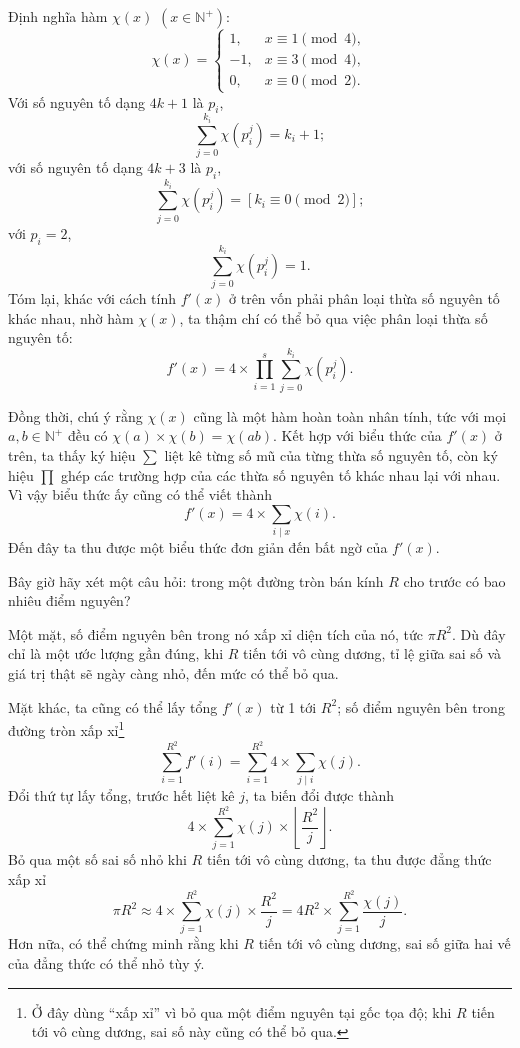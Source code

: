 \documentclass[11pt]{article}
\begin{document}
Định nghĩa hàm \(\chi(x)\) \((x\in\mathbb N^+)\):
\[
\chi(x)=
\begin{cases}
1, & x\equiv1\pmod4,\\
-1, & x\equiv3\pmod4,\\
0, & x\equiv0\pmod2.
\end{cases}
\]
Với số nguyên tố dạng \(4k+1\) là \(p_i\),
\[
  \sum_{j=0}^{k_i}\chi(p_i^j)=k_i+1;
\]
với số nguyên tố dạng \(4k+3\) là \(p_i\),
\[
  \sum_{j=0}^{k_i}\chi(p_i^j)=[k_i\equiv0\pmod2];
\]
với \(p_i=2\),
\[
  \sum_{j=0}^{k_i}\chi(p_i^j)=1.
\]
Tóm lại, khác với cách tính \(f'(x)\) ở trên vốn phải phân loại thừa số nguyên
tố khác nhau, nhờ hàm \(\chi(x)\), ta thậm chí có thể bỏ qua việc phân loại
thừa số nguyên tố:
\[
  f'(x)=4\times\prod_{i=1}^{s}\sum_{j=0}^{k_i}\chi(p_i^j).
\]

Đồng thời, chú ý rằng \(\chi(x)\) cũng là một hàm hoàn toàn nhân tính, tức với
mọi \(a,b\in\mathbb N^+\) đều có \(\chi(a)\times\chi(b)=\chi(ab)\). Kết hợp
với biểu thức của \(f'(x)\) ở trên, ta thấy ký hiệu \(\sum\) liệt kê từng số
mũ của từng thừa số nguyên tố, còn ký hiệu \(\prod\) ghép các trường hợp của
các thừa số nguyên tố khác nhau lại với nhau. Vì vậy biểu thức ấy cũng có thể
viết thành
\[
  f'(x)=4\times\sum_{i\mid x}\chi(i).
\]
Đến đây ta thu được một biểu thức đơn giản đến bất ngờ của \(f'(x)\).

Bây giờ hãy xét một câu hỏi: trong một đường tròn bán kính \(R\) cho trước có
bao nhiêu điểm nguyên?

Một mặt, số điểm nguyên bên trong nó xấp xỉ diện tích của nó, tức \(\pi R^2\).
Dù đây chỉ là một ước lượng gần đúng, khi \(R\) tiến tới vô cùng dương, tỉ lệ
giữa sai số và giá trị thật sẽ ngày càng nhỏ, đến mức có thể bỏ qua.

Mặt khác, ta cũng có thể lấy tổng \(f'(x)\) từ 1 tới \(R^2\); số điểm nguyên
bên trong đường tròn xấp xỉ\footnote{Ở đây dùng ``xấp xỉ'' vì bỏ qua một điểm
nguyên tại gốc tọa độ; khi \(R\) tiến tới vô cùng dương, sai số này cũng có thể
bỏ qua.}
\[
  \sum_{i=1}^{R^2} f'(i)
  =
  \sum_{i=1}^{R^2}4\times\sum_{j\mid i}\chi(j).
\]
Đổi thứ tự lấy tổng, trước hết liệt kê \(j\), ta biến đổi được thành
\[
  4\times\sum_{j=1}^{R^2}\chi(j)\times
  \left\lfloor\frac{R^2}{j}\right\rfloor.
\]
Bỏ qua một số sai số nhỏ khi \(R\) tiến tới vô cùng dương, ta thu được đẳng
thức xấp xỉ
\[
  \pi R^2\approx
  4\times\sum_{j=1}^{R^2}\chi(j)\times\frac{R^2}{j}
  =
  4R^2\times\sum_{j=1}^{R^2}\frac{\chi(j)}{j}.
\]
Hơn nữa, có thể chứng minh rằng khi \(R\) tiến tới vô cùng dương, sai số giữa
hai vế của đẳng thức có thể nhỏ tùy ý.
\end{document}
